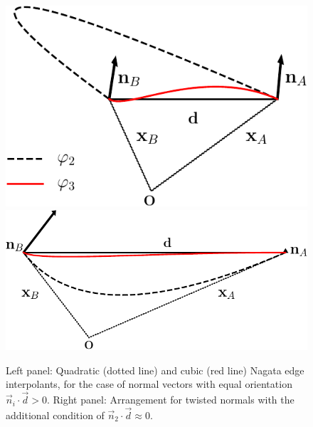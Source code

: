 \documentclass[twocolumn]{biophys-new}
\begin{document}
\begin{figure}[b]
\centering
\includegraphics[width=0.49\linewidth]{fig/inflection_lcrop}
\includegraphics[width=0.49\linewidth]{fig/norf-crop}
\caption{Left panel: Quadratic (dotted line) and cubic (red line) Nagata edge interpolants, for the case of  normal vectors with equal orientation $\vec{n}_i \cdot \vec{d} > 0 $. Right panel: Arrangement for twisted normals with the additional condition of $\vec{n}_2 \cdot \vec{d} \approx 0 $.}
\label{fig:recovery}
\end{figure}
\end{document}
